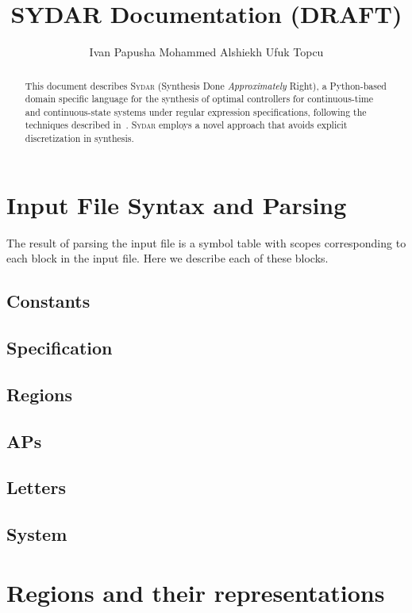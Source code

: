 \documentclass[letterpaper, 10pt, conference]{ieeeconf}   %
\title{\LARGE \bf SYDAR Documentation (DRAFT)}
\author{Ivan Papusha \quad Mohammed Alshiekh \quad Ufuk Topcu}
\begin{document}
\maketitle
\thispagestyle{empty}
\pagestyle{empty}

\begin{abstract}
This document describes \textsc{Sydar} (Synthesis Done \textsl{Approximately} Right), a
Python-based domain specific language for the synthesis of optimal controllers
for continuous-time and continuous-state systems under regular expression
specifications, following the techniques described in~\cite{Papusha:2016a}.
\textsc{Sydar} employs a novel approach that avoids explicit discretization in
synthesis.
\end{abstract}


\section{Input File Syntax and Parsing}

The result of parsing the input file is a symbol table with scopes
corresponding to each block in the input file. Here we describe each of these
blocks.

\subsection{Constants}
\subsection{Specification}
\subsection{Regions}
\subsection{APs}
\subsection{Letters}
\subsection{System}

\section{Regions and their representations}
\end{document}

